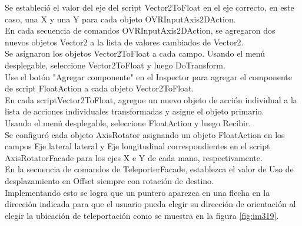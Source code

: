 Se estableció el valor del eje del script Vector2ToFloat en el eje correcto, en este caso, una X y una Y para cada objeto OVRInputAxis2DAction.\\
En cada secuencia de comandos OVRInputAxis2DAction, se agregaron dos nuevos objetos Vector2 a la lista de valores cambiados de Vector2.\\
Se asignaron los objetos Vector2ToFloat a cada campo. Usando el menú desplegable, seleccione Vector2ToFloat y luego DoTransform.\\
Use el botón "Agregar componente" en el Inspector para agregar el componente de script FloatAction a cada objeto Vector2ToFloat.\\
En cada scriptVector2ToFloat, agregue un nuevo objeto de acción individual a la lista de acciones individuales transformadas y asigne el objeto primario.\\
Usando el menú desplegable, seleccione FloatAction y luego Recibir.\\
Se configuró cada objeto AxisRotator asignando un objeto FloatAction en los campos Eje lateral lateral y Eje longitudinal correspondientes en el script AxisRotatorFacade 
para los ejes X e Y de cada mano, respectivamente.\\
En la secuencia de comandos de TeleporterFacade, establezca el valor de Uso de desplazamiento en Offset siempre con rotación de destino.\\
Implementando esto se logra que un puntero aparezca en una flecha en la dirección indicada para que el usuario pueda elegir su dirección de orientación al 
elegir la ubicación de teleportación como se muestra en la figura \ref{fig:im319}.\\

